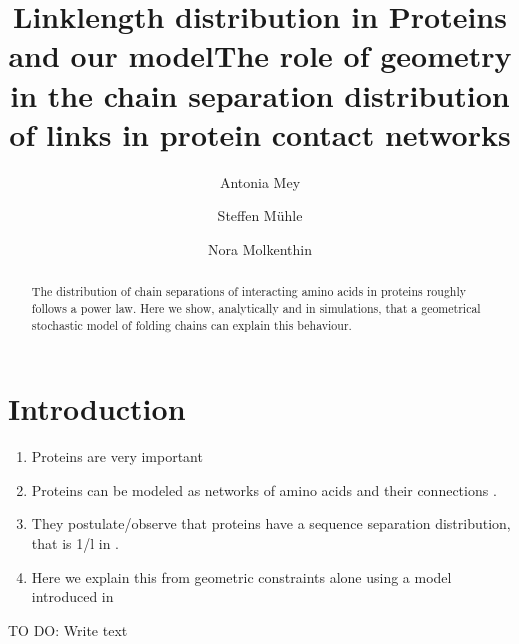 \documentclass[reprint,amsmath,amssymb,rmp,onecolumn,notitlepage,11pt]{revtex4-1}
\begin{document}
\title{Linklength distribution in Proteins and our model}
\title{The role of geometry in the chain separation distribution of links in protein contact networks}
\author{Antonia Mey}
\author{Steffen Mühle}
\author{Nora Molkenthin}

\begin{abstract}
The distribution of chain separations of interacting amino acids in proteins roughly follows a power law. Here we show, analytically and in simulations, that a geometrical stochastic model of folding chains can explain this behaviour. %
\end{abstract}
\maketitle

\section*{Introduction}
\begin{enumerate}
    \item Proteins are very important \cite{a bunch of stuff}
    \item Proteins can be modeled as networks of amino acids and their connections \cite{Vendruscolo2002,DiPaola2013,Estrada2011}.
    \item They postulate/observe that proteins have a sequence separation distribution, that is 1/l in \cite{bartoli2008effect}.
    \item Here we explain this from geometric constraints alone using a model introduced in \cite{Molkenthin2016,molkenthin2020self}
\end{enumerate}
TO DO: Write text
\end{document}
